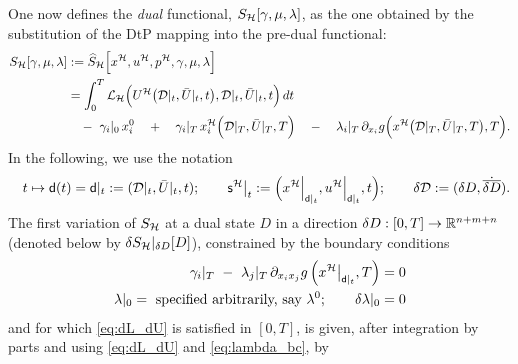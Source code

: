 \documentclass[11pt]{article}
\begin{document}
One now defines the \emph{dual} functional, $S_{\mathcal{H}}[\gamma, \mu,\lambda]$, as the one obtained by the substitution of the DtP mapping into the pre-dual functional:
\begin{equation}\label{eq:pont_dual}
    \begin{aligned}
        S_{\mathcal{H}}[\gamma, \mu,\lambda] & := \widehat{S}_{\mathcal{H}} \Big[x^{\mathcal{H}},u^{\mathcal{H}},p^{\mathcal{H}}, \gamma, \mu, \lambda \Big] \\
        & = \int_0^T \mathcal{L}_{\mathcal{H}}\Big(U^{\mathcal{H}}\big( \mathcal{D}|_t, \bar{U}|_t, t \big),\mathcal{D}|_t, \bar{U}|_t, t \Big) \,dt \\ 
        & \quad - \ \gamma_i|_0 \, x^0_i \quad + \quad  \gamma_i|_T \, x_i^{\mathcal{H}}\Big(\mathcal{D}|_T,\bar{U}|_T,T \Big)  \quad - \quad   \lambda_i|_T \, \partial_{x_i} g \Big(x^{\mathcal{H}} \big(\mathcal{D}|_T,\bar{U}|_T,T \big),T \Big).
    \end{aligned}
\end{equation}
In the following, we use the notation
\[
 \quad t \mapsto \mathsf{d}(t) = \mathsf{d}|_t := (\mathcal{D}|_t,\bar{U}|_t,t) ; \qquad  \mathsf{s}^{\mathcal{H}} \big|_t := \Big( x^{\mathcal{H}} \Big|_{ \mathsf{d}|_t}, u^{\mathcal{H}} \Big|_{ \mathsf{d}|_t}, t \Big); \qquad \delta \mathcal{D} := (\delta D, \dot{\overline{\delta D}}).
\]
The first variation of $S_{\mathcal{H}}$ at a dual state $D$ in a direction $\delta D: [0,T] \to \mathbb R^{n+m+n}$ (denoted below by  $\delta S_{\mathcal{H}}|_{\delta D} [D]$), constrained by the boundary conditions
\begin{subequations}\label{eq:dual_bc}
\begin{align}
   \gamma_i|_T \ - \ \lambda_j|_T \, \partial_{x_i x_j} g \, \Big( x^{\mathcal{H}} \big|_{ \mathsf{d}|_t} , T \Big)  & = 0 \label{eq:gamma_bc}\\
   \lambda|_0 = \ \mbox{specified arbitrarily, say } \lambda^0; \qquad \delta \lambda|_0 & = 0 \label{eq:lambda_bc}
\end{align}
\end{subequations}
and for which \eqref{eq:dL_dU} is satisfied in $[0,T]$, is given, after integration by parts and using \eqref{eq:dL_dU} and \eqref{eq:lambda_bc}, by
\begingroup
\allowdisplaybreaks
\end{document}
